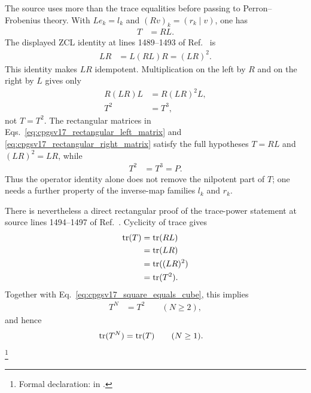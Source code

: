 \documentclass{article}
\begin{document}
The source uses more than the trace equalities before passing to
Perron--Frobenius theory. With $Le_k=l_k$ and
$(Rv)_k=(r_k\mid v)$, one has
\begin{align}
    T
        &= RL.
    \label{eq:cpgsv17_pairing_trace_product}
\end{align}
The displayed ZCL identity at lines 1489--1493 of
Ref.~\cite{Cirac2016MPDO_arXiv} is
\begin{align}
    LR
        &= L(RL)R
         = (LR)^2.
    \label{eq:cpgsv17_source_pairing_idempotence}
\end{align}
This identity makes $LR$ idempotent. Multiplication on the left by $R$ and on
the right by $L$ gives only
\begin{align}
    R(LR)L
        &= R(LR)^2L,
    \label{eq:cpgsv17_rectangular_multiplication_step}\\
    T^2
        &= T^3,
    \label{eq:cpgsv17_square_equals_cube}
\end{align}
not $T=T^2$. The rectangular matrices in
Eqs.~\ref{eq:cpgsv17_rectangular_left_matrix} and
\ref{eq:cpgsv17_rectangular_right_matrix} satisfy the full hypotheses
$T=RL$ and $(LR)^2=LR$, while
\begin{align}
    T^2
        &= T^3
         = P.
    \label{eq:cpgsv17_counterexample_square_cube}
\end{align}
Thus the operator identity alone does not remove the nilpotent part of $T$;
one needs a further property of the inverse-map families $l_k$ and $r_k$.

There is nevertheless a direct rectangular proof of the trace-power statement
at source lines 1494--1497 of
Ref.~\cite{Cirac2016MPDO_arXiv}. Cyclicity of trace gives
\begin{align}
    \operatorname{tr}(T)
        &= \operatorname{tr}(RL)
    \label{eq:cpgsv17_trace_rectangular_product}\\
        &= \operatorname{tr}(LR)
    \label{eq:cpgsv17_trace_cyclic_swap}\\
        &= \operatorname{tr}((LR)^2)
    \label{eq:cpgsv17_trace_pairing_square}\\
        &= \operatorname{tr}(T^2).
    \label{eq:cpgsv17_trace_equals_trace_square}
\end{align}
Together with Eq.~\ref{eq:cpgsv17_square_equals_cube}, this implies
\begin{align}
    T^N
        &= T^2
        \qquad (N\geq 2),
    \label{eq:cpgsv17_power_stabilization_from_square_cube}
\end{align}
and hence
\begin{align}
    \operatorname{tr}(T^N)
        &= \operatorname{tr}(T)
        \qquad (N\geq 1).
    \label{eq:cpgsv17_rectangular_constant_traces}
\end{align}
\footnote{\sloppy Formal declaration:
{\scriptsize{}} in
.}
\end{document}
